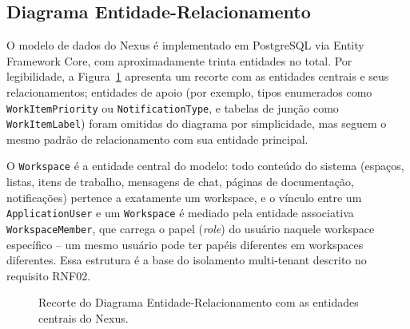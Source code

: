 \documentclass[12pt]{article}
\begin{document}
\subsection{Diagrama Entidade-Relacionamento}

O modelo de dados do Nexus é implementado em PostgreSQL \cite{postgresql} via Entity Framework Core, com aproximadamente trinta entidades no total. Por legibilidade, a Figura~\ref{fig:der} apresenta um recorte com as entidades centrais e seus relacionamentos; entidades de apoio (por exemplo, tipos enumerados como \texttt{WorkItemPriority} ou \texttt{NotificationType}, e tabelas de junção como \texttt{WorkItemLabel}) foram omitidas do diagrama por simplicidade, mas seguem o mesmo padrão de relacionamento com sua entidade principal.

O \texttt{Workspace} é a entidade central do modelo: todo conteúdo do sistema (espaços, listas, itens de trabalho, mensagens de chat, páginas de documentação, notificações) pertence a exatamente um workspace, e o vínculo entre um \texttt{ApplicationUser} e um \texttt{Workspace} é mediado pela entidade associativa \texttt{WorkspaceMember}, que carrega o papel (\emph{role}) do usuário naquele workspace específico -- um mesmo usuário pode ter papéis diferentes em workspaces diferentes. Essa estrutura é a base do isolamento multi-tenant descrito no requisito RNF02.

\begin{figure}[H]
\centering
{}
\caption{Recorte do Diagrama Entidade-Relacionamento com as entidades centrais do Nexus.}
\label{fig:der}
\end{figure}
\end{document}
